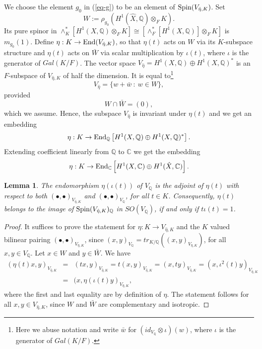 \documentclass[12pt]{amsart}
\numberwithin{equation}{subsection}
\theoremstyle{plain}
\newtheorem{lem}[thm]{Lemma}
\theoremstyle{definition}
\newcommand{\CC}{{\mathbb C}}
\newcommand{\QQ}{{\mathbb Q}}
\newcommand{\Spin}{{\rm Spin}}
\newcommand{\End}{{\rm End}}
\begin{document}
{We choose the element $g_0$ in (\ref{eq-g}) to be an element of $\Spin(V_{\hat{\eta},K})$. 
Set 
\[
W:=\rho_{g_0}(H^1(\hat{X},\QQ)\otimes_FK).
\]
Its pure spinor in $\wedge^*_K [H^1(X,\QQ)\otimes_FK]\cong [\wedge^*_F [H^1(X,\QQ)]\otimes_FK]$ is $m_{g_0}(1)$. 
Define $\eta:K\rightarrow \End(V_{\hat{\eta},K})$, so that $\eta(t)$
acts on $W$ via its $K$-subspace structure and $\eta(t)$ acts on $\bar{W}$ via scalar multiplication by $\iota(t)$, where $\iota$ is the generator of $Gal(K/F)$. The vector space 
$V_{\hat{\eta}}=H^1(X,\QQ)\oplus H^1(X,\QQ)^*$ is an $F$-subspace of $V_{\hat{\eta},K}$ of half the dimension. 
It is equal to\footnote{Here we abuse notation and write $\bar{w}$ for $(id_{V_\QQ}\otimes \iota)(w)$, where $\iota$ is the generator of $Gal(K/F)$. 
} 
\begin{equation}
\label{eq-V-QQ-is-isomorphic-to-W-T}
V_{\hat{\eta}}=\{w+\bar{w} \ : \ w\in W\},
\end{equation}
provided 
\begin{equation}
\label{eq-W-T-and-its-conjugate-are-complementary}
W\cap \bar{W}=(0),
\end{equation} 
which we assume. 
Hence, the subspace $V_{\hat{\eta}}$ is invariant under $\eta(t)$ and we get an embedding
\[
\eta:K\rightarrow \End_\QQ\left[H^1(X,\QQ)\oplus H^1(X,\QQ)^*\right].
\]
Extending coefficient linearly from $\QQ$ to $\CC$ we get the embedding
\[
\eta:K\rightarrow \End_\CC\left[H^1(X,\CC)\oplus H^1(\hat{X},\CC)\right].
\]

\begin{lem}
\label{lemma-units-are-isometries}
The endomorphism $\eta(\iota(t))$ of $V_\QQ$ is the adjoint of $\eta(t)$ with respect to both $(\bullet,\bullet)_{V_{\hat{\eta},K}}$ and $(\bullet,\bullet)_{V_\QQ}$, for all $t\in K$. Consequently, $\eta(t)$ belongs to the image of $\Spin(V_{\hat{\eta},K})_\QQ$ in $SO(V_\QQ)$, if and only if $t\iota(t)=1$.
\end{lem}

\begin{proof}
It suffices to prove the statement for $\eta:K\rightarrow V_{\hat{\eta},K}$ and the $K$ valued bilinear pairing $(\bullet,\bullet)_{V_{\hat{\eta},K}}$, since
$(x,y)_{V_\QQ}=tr_{K/\QQ}((x,y)_{V_{\hat{\eta},K}})$, for all $x,y\in V_\QQ$. Let $x\in W$ and $y\in\bar{W}$. We have
\begin{eqnarray*}
(\eta(t)x,y)_{V_{\hat{\eta},K}}&=&(tx,y)_{V_{\hat{\eta},K}}=t(x,y)_{V_{\hat{\eta},K}}=(x,ty)_{V_{\hat{\eta},K}}=(x,\iota^2(t)y)_{V_{\hat{\eta},K}}
\\
&=& (x,\eta(\iota(t)y)_{V_{\hat{\eta},K}},
\end{eqnarray*}
where the first and last equality are by definition of $\eta$. The statement follows for all $x,y\in V_{\hat{\eta},K}$, since $W$ and $\bar{W}$ are complementary and isotropic.


\end{proof}}
\end{document}
